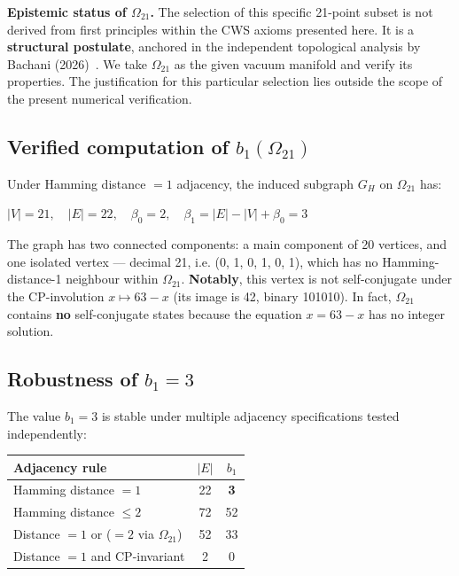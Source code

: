 \documentclass[11pt,a4paper]{article}
\begin{document}
\bigskip
\textbf{Epistemic status of \(\Omega_{21}\).}  
The selection of this specific 21-point subset is not derived from first principles within the CWS axioms presented here. It is a \textbf{structural postulate}, anchored in the independent topological analysis by Bachani (2026)~\cite{Bachani2026}. We take \(\Omega_{21}\) as the given vacuum manifold and verify its properties. The justification for this particular selection lies outside the scope of the present numerical verification.

\subsection{Verified computation of \texorpdfstring{$b_1(\Omega_{21})$}{b1(Omega21)}}

\begin{result_box}[title={Independent verification (NetworkX)}]
Under Hamming distance $= 1$ adjacency, the induced subgraph $G_H$ on $\Omega_{21}$ has:
\begin{center}
$|V| = 21, \quad |E| = 22, \quad \beta_0 = 2, \quad \beta_1 = |E| - |V| + \beta_0 = 3$
\end{center}
The graph has two connected components: a main component of 20 vertices, and one isolated vertex — decimal 21, i.e. (0, 1, 0, 1, 0, 1), which has no Hamming-distance-1 neighbour within $\Omega_{21}$.  
\textbf{Notably}, this vertex is not self-conjugate under the CP-involution $x \mapsto 63 - x$ (its image is 42, binary 101010). In fact, $\Omega_{21}$ contains \textbf{no} self-conjugate states because the equation $x = 63 - x$ has no integer solution. 
\end{result_box}

\subsection{Robustness of \texorpdfstring{$b_1 = 3$}{b1 = 3}}

The value $b_1 = 3$ is stable under multiple adjacency specifications tested independently:

\begin{center}
\begin{tabular}{lcc}
\toprule
Adjacency rule & $|E|$ & $b_1$ \\
\midrule
Hamming distance $= 1$ & 22 & \textbf{3} \\
Hamming distance $\leq 2$ & 72 & 52 \\
Distance $= 1$ or ($= 2$ via $\Omega_{21}$) & 52 & 33 \\
Distance $= 1$ and CP-invariant & 2 & 0 \\
\bottomrule
\end{tabular}
\end{center}
\end{document}
